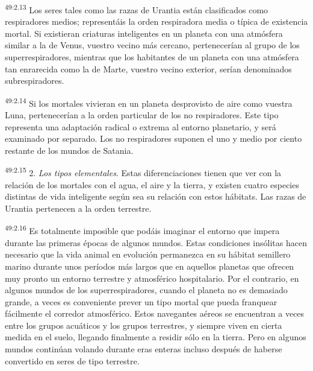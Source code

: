 \par
\textsuperscript{49:2.13} Los seres tales como las razas de Urantia están clasificados como respiradores medios; representáis la orden respiradora media o típica de existencia mortal. Si existieran criaturas inteligentes en un planeta con una atmósfera similar a la de Venus, vuestro vecino más cercano, pertenecerían al grupo de los superrespiradores, mientras que los habitantes de un planeta con una atmósfera tan enrarecida como la de Marte, vuestro vecino exterior, serían denominados subrespiradores.

\par
\textsuperscript{49:2.14} Si los mortales vivieran en un planeta desprovisto de aire como vuestra Luna, pertenecerían a la orden particular de los no respiradores. Este tipo representa una adaptación radical o extrema al entorno planetario, y será examinado por separado. Los no respiradores suponen el uno y medio por ciento restante de los mundos de Satania.

\par
\textsuperscript{49:2.15} 2. \textit{Los tipos elementales}. Estas diferenciaciones tienen que ver con la relación de los mortales con el agua, el aire y la tierra, y existen cuatro especies distintas de vida inteligente según sea su relación con estos hábitats. Las razas de Urantia pertenecen a la orden terrestre.

\par
\textsuperscript{49:2.16} Es totalmente imposible que podáis imaginar el entorno que impera durante las primeras épocas de algunos mundos. Estas condiciones insólitas hacen necesario que la vida animal en evolución permanezca en su hábitat semillero marino durante unos períodos más largos que en aquellos planetas que ofrecen muy pronto un entorno terrestre y atmosférico hospitalario. Por el contrario, en algunos mundos de los superrespiradores, cuando el planeta no es demasiado grande, a veces es conveniente prever un tipo mortal que pueda franquear fácilmente el corredor atmosférico. Estos navegantes aéreos se encuentran a veces entre los grupos acuáticos y los grupos terrestres, y siempre viven en cierta medida en el suelo, llegando finalmente a residir sólo en la tierra. Pero en algunos mundos continúan volando durante eras enteras incluso después de haberse convertido en seres de tipo terrestre.

